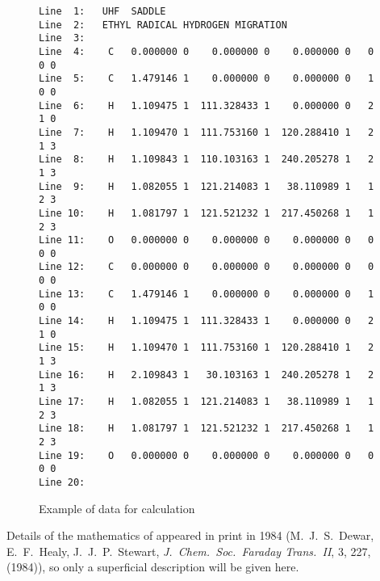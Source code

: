 \begin{figure}
\begin{makeimage}
\end{makeimage}
\begin{verbatim}
Line  1:   UHF  SADDLE
Line  2:   ETHYL RADICAL HYDROGEN MIGRATION
Line  3:
Line  4:    C   0.000000 0    0.000000 0    0.000000 0   0 0 0
Line  5:    C   1.479146 1    0.000000 0    0.000000 0   1 0 0
Line  6:    H   1.109475 1  111.328433 1    0.000000 0   2 1 0
Line  7:    H   1.109470 1  111.753160 1  120.288410 1   2 1 3
Line  8:    H   1.109843 1  110.103163 1  240.205278 1   2 1 3
Line  9:    H   1.082055 1  121.214083 1   38.110989 1   1 2 3
Line 10:    H   1.081797 1  121.521232 1  217.450268 1   1 2 3
Line 11:    O   0.000000 0    0.000000 0    0.000000 0   0 0 0
Line 12:    C   0.000000 0    0.000000 0    0.000000 0   0 0 0
Line 13:    C   1.479146 1    0.000000 0    0.000000 0   1 0 0
Line 14:    H   1.109475 1  111.328433 1    0.000000 0   2 1 0
Line 15:    H   1.109470 1  111.753160 1  120.288410 1   2 1 3
Line 16:    H   2.109843 1   30.103163 1  240.205278 1   2 1 3
Line 17:    H   1.082055 1  121.214083 1   38.110989 1   1 2 3
Line 18:    H   1.081797 1  121.521232 1  217.450268 1   1 2 3
Line 19:    O   0.000000 0    0.000000 0    0.000000 0   0 0 0
Line 20:
\end{verbatim}
\caption{\label{c2h5s} Example of data for  calculation}
\end{figure}

Details of the mathematics of  appeared  in  print  in  1984 (M.\
J.\ S.\ Dewar,  E.\ F.\ Healy,  J.\ J.\ P.\ Stewart,  {\em J.\ Chem.\ Soc.\ 
Faraday Trans.\ II}, 3, 227, (1984)), so only a  superficial  description 
will  be given here.

